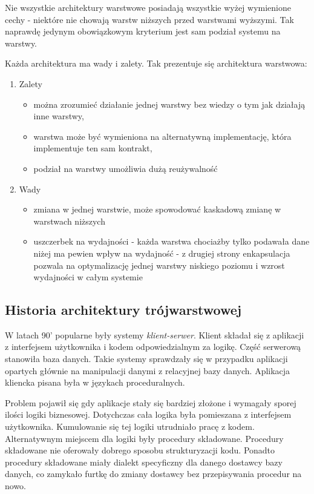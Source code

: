 \documentclass[a4paper,onecolumn,oneside,11pt,wide,floatssmall]{mwrep}
\theoremstyle{definition}
\theoremstyle{plain}%
\theoremstyle{remark}
\begin{document}
Nie wszystkie architektury warstwowe posiadają wszystkie wyżej wymienione cechy - niektóre nie chowają warstw niższych 
przed warstwami wyższymi. Tak naprawdę jedynym obowiązkowym kryterium jest sam podział systemu na warstwy.

Każda architektura ma wady i zalety. Tak prezentuje się architektura warstwowa:

\begin{enumerate}
  \item Zalety
    \begin{itemize}
      \item można zrozumieć działanie jednej warstwy bez wiedzy o tym jak działają inne warstwy,
      \item warstwa może być wymieniona na alternatywną implementację, która implementuje ten sam kontrakt,
      \item podział na warstwy umożliwia dużą reużywalność
    \end{itemize}
  \item Wady
    \begin{itemize}
      \item zmiana w jednej warstwie, może spowodować kaskadową zmianę w warstwach niższych
      \item uszczerbek na wydajności - każda warstwa chociażby tylko podawała dane niżej ma pewien wpływ na wydajność -
       z drugiej strony enkapsulacja pozwala na optymalizację jednej warstwy niskiego poziomu i wzrost wydajności w 
       całym systemie
    \end{itemize}
\end{enumerate}

\subsection{Historia architektury trójwarstwowej}
W latach 90' popularne były systemy \emph{klient-serwer}. Klient składał się z aplikacji z interfejsem użytkownika i 
kodem odpowiedzialnym za logikę. Część serwerową stanowiła baza danych. Takie systemy sprawdzały się w przypadku 
aplikacji opartych głównie na manipulacji danymi z relacyjnej bazy danych. Aplikacja kliencka pisana była w językach 
proceduralnych.

Problem pojawił się gdy aplikacje stały się bardziej złożone i wymagały sporej ilości logiki biznesowej. Dotychczas 
cała logika była pomieszana z interfejsem użytkownika. Kumulowanie się tej logiki utrudniało pracę z kodem. 
Alternatywnym miejscem dla logiki były procedury składowane. Procedury składowane nie oferowały dobrego sposobu 
strukturyzacji kodu. Ponadto procedury składowane miały dialekt specyficzny dla danego dostawcy bazy danych, co 
zamykało furtkę do zmiany dostawcy bez przepisywania procedur na nowo. 
\end{document}
